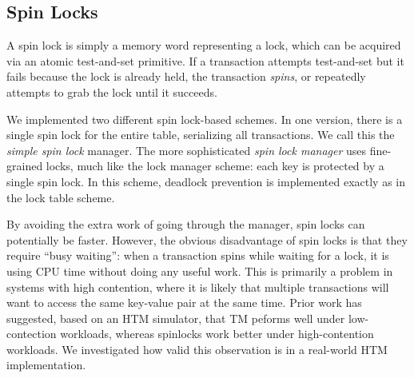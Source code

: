 \subsection{Spin Locks}

A spin lock is simply a memory word representing a lock, which can be acquired
via an atomic test-and-set primitive. If a transaction attempts test-and-set but
it fails because the lock is already held, the transaction \textit{spins}, or
repeatedly attempts to grab the lock until it succeeds.

We implemented two different spin lock-based schemes. In one version, there is a
single spin lock for the entire table, serializing all transactions. We call
this the \textit{simple spin lock} manager. The more sophisticated \textit{spin lock manager} uses
fine-grained locks, much like the lock manager scheme: each key is protected by
a single spin lock. In this scheme, deadlock prevention is implemented exactly
as in the lock table scheme.

By avoiding the extra work of going through the manager, spin locks can
potentially be faster. However, the obvious disadvantage of spin locks is that
they require ``busy waiting'': when a transaction spins while waiting for a
lock, it is using CPU time without doing any useful work. This is primarily a
problem in systems with high contention, where it is likely that multiple
transactions will want to access the same key-value pair at the same time. Prior
work \citep{tran2010} has suggested, based on an HTM simulator, that TM peforms
well under low-contection workloads, whereas spinlocks work better under
high-contention workloads. We investigated how valid this observation is in a
real-world HTM implementation.


